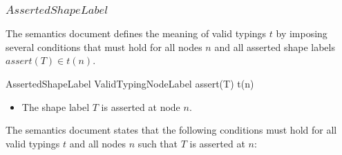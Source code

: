 \documentclass{article}
\begin{document}
\subsubsection{$AssertedShapeLabel$}

The semantics document defines the meaning of valid typings $t$ by imposing several conditions that must hold for all nodes $n$ and all
asserted shape labels $assert(T) \in t(n)$.
\begin{schema}{AssertedShapeLabel}
	ValidTypingNodeLabel
\where
	assert(T) \in t(n)
\end{schema}
\begin{itemize}
\item The shape label $T$ is asserted at node $n$.
\end{itemize}

The semantics document states that the following conditions must hold for all valid typings $t$ and all nodes $n$ such that $T$ is asserted at $n$:
\end{document}
